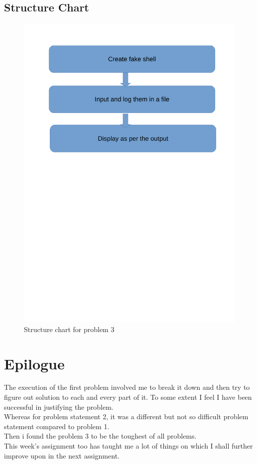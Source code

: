 \documentclass[11pt]{report}
\begin{document}
	\subsection{Structure Chart}
	\begin{figure}[h!]
	\centering
	\includegraphics[scale=0.7]{images/shots33}
	\caption{Structure chart for problem 3}	
	\end{figure}
	\pagebreak
	\fi
	\pagebreak
\section{Epilogue}
The execution of the first problem involved me to break it down and then try to figure out solution to each and every part of it. To some extent I feel I have been successful in justifying the problem.\\
Whereas for problem statement 2, it was a different but not so difficult problem statement compared to problem 1. \\
Then i found the problem 3 to be the toughest of all problems.\\
This week's assignment too has taught me a lot of things on which I shall further improve upon in the next assignment.\\


\nocite{*}
\end{document}
